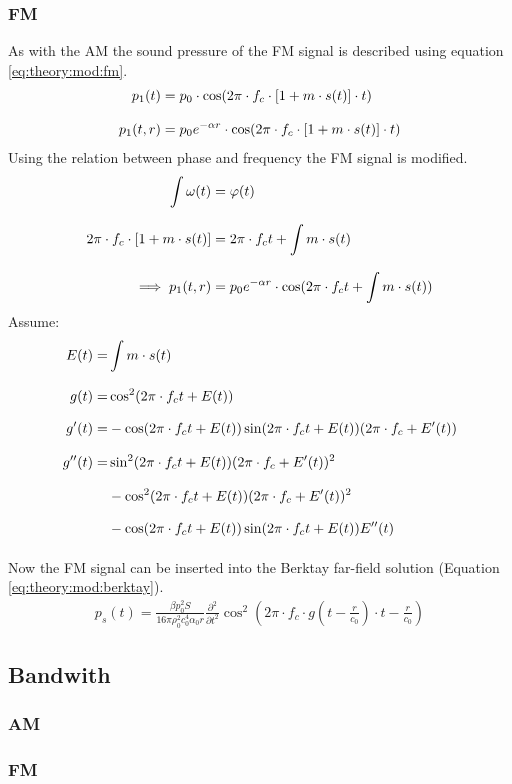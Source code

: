 %

\subsubsection*{FM}

As with the AM the sound pressure of the FM signal is described using equation \ref{eq:theory:mod:fm}.
%
\begin{align}
  p_1(t) &= p_0 \cdot \cos (2 \pi \cdot f_c \cdot [1 + m \cdot s(t)] \cdot t)\pmath
  p_1(t, r) &= p_0 e^{- \alpha r} \cdot \cos (2 \pi \cdot f_c \cdot [1 + m \cdot s(t)] \cdot t)
\end{align}
%
Using the relation between phase and frequency the FM signal is modified.
%
\begin{align}
 \int \omega(t) &= \varphi(t)\pmath
 2 \pi \cdot f_c \cdot [1 + m \cdot s(t)] &= 2 \pi \cdot f_c t + \int m \cdot s(t)\pmath
 \implies \space p_1(t, r) &= p_0 e^{- \alpha r} \cdot \cos (2 \pi \cdot f_c t + \int m \cdot s(t))
\end{align}
%
%
%
Assume:
%
\begin{align}
  E(t) =& \int m \cdot s(t)\pmath
  g(t) =& \cos^2 (2 \pi \cdot f_c t + E(t))\pmath
  g'(t) =& - \cos (2 \pi \cdot f_c t + E(t)) \sin (2 \pi \cdot f_c t + E(t)) (2 \pi \cdot f_c + E'(t)) \pmath
  g''(t) =& \sin^2 (2 \pi \cdot f_c t + E(t)) (2 \pi \cdot f_c + E'(t))^2 \pmath
  &- \cos^2 (2 \pi \cdot f_c t + E(t)) (2 \pi \cdot f_c + E'(t))^2 \pmath
  &- \cos (2 \pi \cdot f_c t + E(t)) \sin (2 \pi \cdot f_c t + E(t)) E''(t) \pmath
\end{align}
%
Now the FM signal can be inserted into the Berktay far-field solution (Equation \ref{eq:theory:mod:berktay}).
%
\begin{align}
  p_s(t) = \frac{\beta p_0^2 S}{16 \pi \rho_0^2 c_0^4 \alpha_0 r} \frac{\partial^2}{\partial t^2} \cos^2 \left(2 \pi \cdot f_c \cdot g\left(t - \frac{r}{c_0}\right) \cdot t - \frac{r}{c_0}\right)
\end{align}
%

\subsection{Bandwith}

\subsubsection*{AM}

\subsubsection*{FM}